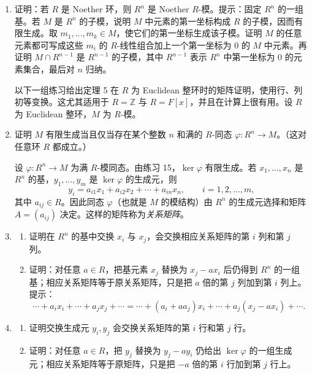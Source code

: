 \begin{enumerate}[label=\arabic*.]
\item 证明：若 $R$ 是 Noether 环，则 $R^n$ 是 Noether $R$-模。提示：固定 $R^n$ 的一组基。若 $M$ 是 $R^n$ 的子模，说明 $M$ 中元素的第一坐标构成 $R$ 的子模，因而有限生成。取 $m_1,
\ldots,m_k\in M$，使它们的第一坐标生成该子模。证明 $M$ 的任意元素都可写成这些 $m_i$ 的 $R$-线性组合加上一个第一坐标为 $0$ 的 $M$ 中元素。再证明 $M\cap R^{n-1}$ 是 $R^{n-1}$ 的子模，其中 $R^{n-1}$ 表示 $R^n$ 中第一坐标为 $0$ 的元素集合，最后对 $n$ 归纳。

\medskip
以下一组练习给出定理 5 在 $R$ 为 Euclidean 整环时的矩阵证明，使用行、列初等变换。这尤其适用于 $R=\mathbb Z$ 与 $R=F[x]$，并且在计算上很有用。设 $R$ 为 Euclidean 整环，$M$ 为 $R$-模。

\item 证明 $M$ 有限生成当且仅当存在某个整数 $n$ 和满的 $R$-同态 $\varphi:R^n\to M$。（这对任意环 $R$ 都成立。）

设 $\varphi:R^n\to M$ 为满 $R$-模同态。由练习 15，$\ker\varphi$ 有限生成。若 $x_1,
\ldots,x_n$ 是 $R^n$ 的基，$y_1,
\ldots,y_m$ 是 $\ker\varphi$ 的生成元，则
\[
y_i=a_{i1}x_1+a_{i2}x_2+\cdots+a_{in}x_n,
\qquad i=1,2,\ldots,m,
\]
其中 $a_{ij}\in R$。因此同态 $\varphi$（也就是 $M$ 的模结构）由 $R^n$ 的生成元选择和矩阵 $A=(a_{ij})$ 决定。这样的矩阵称为\emph{关系矩阵}。

\item
\begin{enumerate}[label=(\alph*)]
\item 证明在 $R^n$ 的基中交换 $x_i$ 与 $x_j$，会交换相应关系矩阵的第 $i$ 列和第 $j$ 列。
\item 证明：对任意 $a\in R$，把基元素 $x_j$ 替换为 $x_j-ax_i$ 后仍得到 $R^n$ 的一组基；相应关系矩阵等于原关系矩阵，只是把 $a$ 倍的第 $j$ 列加到第 $i$ 列上。提示：
\[
\cdots+a_ix_i+\cdots+a_jx_j+\cdots
=\cdots+(a_i+aa_j)x_i+\cdots+a_j(x_j-ax_i)+\cdots.
\]
\end{enumerate}

\item
\begin{enumerate}[label=(\alph*)]
\item 证明交换生成元 $y_i,y_j$ 会交换关系矩阵的第 $i$ 行和第 $j$ 行。
\item 证明：对任意 $a\in R$，把 $y_j$ 替换为 $y_j-ay_i$ 仍给出 $\ker\varphi$ 的一组生成元；相应关系矩阵等于原矩阵，只是把 $-a$ 倍的第 $i$ 行加到第 $j$ 行上。
\end{enumerate}


\end{enumerate}
